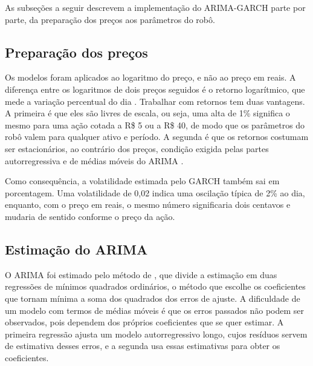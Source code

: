 As subseções a seguir descrevem a implementação do ARIMA-GARCH parte por parte,
da preparação dos preços aos parâmetros do robô.

\subsection{Preparação dos preços}

Os modelos foram aplicados ao logaritmo do preço, e não ao preço em reais. A
diferença entre os logaritmos de dois preços seguidos é o retorno logarítmico, que
mede a variação percentual do dia \cite{thomaz2019}. Trabalhar com retornos tem
duas vantagens. A primeira é que eles são livres de escala, ou seja, uma alta de
1\% significa o mesmo para uma ação cotada a R\$ 5 ou a R\$ 40, de modo que os
parâmetros do robô valem para qualquer ativo e período. A segunda é que os
retornos costumam ser estacionários, ao contrário dos preços, condição exigida
pelas partes autorregressiva e de médias móveis do ARIMA \cite{thomaz2019}.

Como consequência, a volatilidade estimada pelo GARCH também sai em porcentagem.
Uma volatilidade de 0,02 indica uma oscilação típica de 2\% ao dia, enquanto, com
o preço em reais, o mesmo número significaria dois centavos e mudaria de sentido
conforme o preço da ação.

\subsection{Estimação do ARIMA}

O ARIMA foi estimado pelo método de , que divide a
estimação em duas regressões de mínimos quadrados ordinários, o método que escolhe
os coeficientes que tornam mínima a soma dos quadrados dos erros de ajuste. A dificuldade de um modelo com
termos de médias móveis é que os erros passados não podem ser observados, pois
dependem dos próprios coeficientes que se quer estimar. A primeira regressão
ajusta um modelo autorregressivo longo, cujos resíduos servem de estimativa desses
erros, e a segunda usa essas estimativas para obter os coeficientes.

